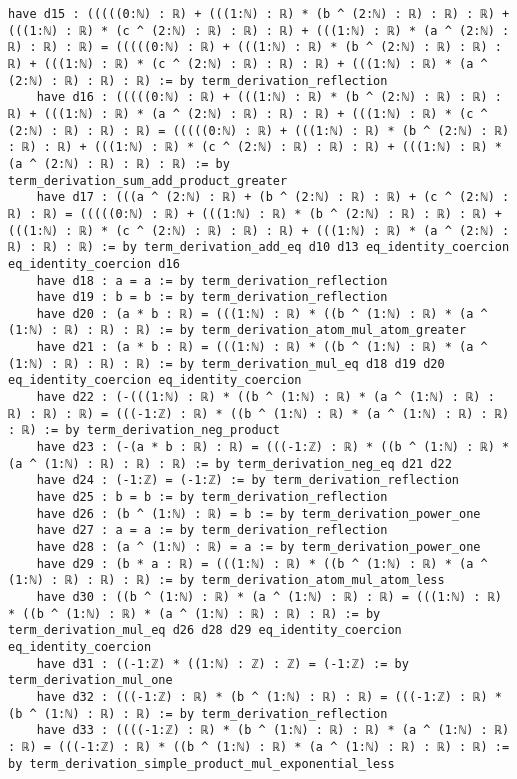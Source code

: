 \documentclass{article}
\begin{document}
\begin{tcolorbox}[colback=white!10, width=\linewidth]
\begin{lstlisting}[language=Lean4]
    have d15 : (((((0:ℕ) : ℝ) + (((1:ℕ) : ℝ) * (b ^ (2:ℕ) : ℝ) : ℝ) : ℝ) + (((1:ℕ) : ℝ) * (c ^ (2:ℕ) : ℝ) : ℝ) : ℝ) + (((1:ℕ) : ℝ) * (a ^ (2:ℕ) : ℝ) : ℝ) : ℝ) = (((((0:ℕ) : ℝ) + (((1:ℕ) : ℝ) * (b ^ (2:ℕ) : ℝ) : ℝ) : ℝ) + (((1:ℕ) : ℝ) * (c ^ (2:ℕ) : ℝ) : ℝ) : ℝ) + (((1:ℕ) : ℝ) * (a ^ (2:ℕ) : ℝ) : ℝ) : ℝ) := by term_derivation_reflection
    have d16 : (((((0:ℕ) : ℝ) + (((1:ℕ) : ℝ) * (b ^ (2:ℕ) : ℝ) : ℝ) : ℝ) + (((1:ℕ) : ℝ) * (a ^ (2:ℕ) : ℝ) : ℝ) : ℝ) + (((1:ℕ) : ℝ) * (c ^ (2:ℕ) : ℝ) : ℝ) : ℝ) = (((((0:ℕ) : ℝ) + (((1:ℕ) : ℝ) * (b ^ (2:ℕ) : ℝ) : ℝ) : ℝ) + (((1:ℕ) : ℝ) * (c ^ (2:ℕ) : ℝ) : ℝ) : ℝ) + (((1:ℕ) : ℝ) * (a ^ (2:ℕ) : ℝ) : ℝ) : ℝ) := by term_derivation_sum_add_product_greater
    have d17 : (((a ^ (2:ℕ) : ℝ) + (b ^ (2:ℕ) : ℝ) : ℝ) + (c ^ (2:ℕ) : ℝ) : ℝ) = (((((0:ℕ) : ℝ) + (((1:ℕ) : ℝ) * (b ^ (2:ℕ) : ℝ) : ℝ) : ℝ) + (((1:ℕ) : ℝ) * (c ^ (2:ℕ) : ℝ) : ℝ) : ℝ) + (((1:ℕ) : ℝ) * (a ^ (2:ℕ) : ℝ) : ℝ) : ℝ) := by term_derivation_add_eq d10 d13 eq_identity_coercion eq_identity_coercion d16
    have d18 : a = a := by term_derivation_reflection
    have d19 : b = b := by term_derivation_reflection
    have d20 : (a * b : ℝ) = (((1:ℕ) : ℝ) * ((b ^ (1:ℕ) : ℝ) * (a ^ (1:ℕ) : ℝ) : ℝ) : ℝ) := by term_derivation_atom_mul_atom_greater
    have d21 : (a * b : ℝ) = (((1:ℕ) : ℝ) * ((b ^ (1:ℕ) : ℝ) * (a ^ (1:ℕ) : ℝ) : ℝ) : ℝ) := by term_derivation_mul_eq d18 d19 d20 eq_identity_coercion eq_identity_coercion
    have d22 : (-(((1:ℕ) : ℝ) * ((b ^ (1:ℕ) : ℝ) * (a ^ (1:ℕ) : ℝ) : ℝ) : ℝ) : ℝ) = (((-1:ℤ) : ℝ) * ((b ^ (1:ℕ) : ℝ) * (a ^ (1:ℕ) : ℝ) : ℝ) : ℝ) := by term_derivation_neg_product
    have d23 : (-(a * b : ℝ) : ℝ) = (((-1:ℤ) : ℝ) * ((b ^ (1:ℕ) : ℝ) * (a ^ (1:ℕ) : ℝ) : ℝ) : ℝ) := by term_derivation_neg_eq d21 d22
    have d24 : (-1:ℤ) = (-1:ℤ) := by term_derivation_reflection
    have d25 : b = b := by term_derivation_reflection
    have d26 : (b ^ (1:ℕ) : ℝ) = b := by term_derivation_power_one
    have d27 : a = a := by term_derivation_reflection
    have d28 : (a ^ (1:ℕ) : ℝ) = a := by term_derivation_power_one
    have d29 : (b * a : ℝ) = (((1:ℕ) : ℝ) * ((b ^ (1:ℕ) : ℝ) * (a ^ (1:ℕ) : ℝ) : ℝ) : ℝ) := by term_derivation_atom_mul_atom_less
    have d30 : ((b ^ (1:ℕ) : ℝ) * (a ^ (1:ℕ) : ℝ) : ℝ) = (((1:ℕ) : ℝ) * ((b ^ (1:ℕ) : ℝ) * (a ^ (1:ℕ) : ℝ) : ℝ) : ℝ) := by term_derivation_mul_eq d26 d28 d29 eq_identity_coercion eq_identity_coercion
    have d31 : ((-1:ℤ) * ((1:ℕ) : ℤ) : ℤ) = (-1:ℤ) := by term_derivation_mul_one
    have d32 : (((-1:ℤ) : ℝ) * (b ^ (1:ℕ) : ℝ) : ℝ) = (((-1:ℤ) : ℝ) * (b ^ (1:ℕ) : ℝ) : ℝ) := by term_derivation_reflection
    have d33 : ((((-1:ℤ) : ℝ) * (b ^ (1:ℕ) : ℝ) : ℝ) * (a ^ (1:ℕ) : ℝ) : ℝ) = (((-1:ℤ) : ℝ) * ((b ^ (1:ℕ) : ℝ) * (a ^ (1:ℕ) : ℝ) : ℝ) : ℝ) := by term_derivation_simple_product_mul_exponential_less

\end{lstlisting}
\end{tcolorbox}
\end{document}
